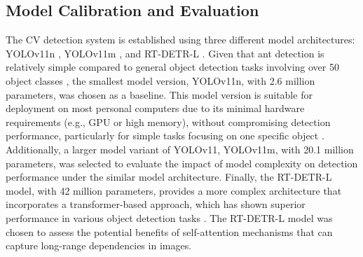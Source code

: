 \subsection{Model Calibration and Evaluation}

The CV detection system is established using three different model architectures: YOLOv11n \cite{jocher_yolo_2023}, YOLOv11m \cite{jocher_yolo_2023}, and RT-DETR-L \cite{ultralytics_rt-detr_nodate,lv_rtdetrv2_2024}. Given that ant detection is relatively simple compared to general object detection tasks involving over 50 object classes \cite{everingham_pascal_2010,lin_microsoft_2015}, the smallest model version, YOLOv11n, with 2.6 million parameters, was chosen as a baseline. This model version is suitable for deployment on most personal computers due to its minimal hardware requirements (e.g., GPU or high memory), without compromising detection performance, particularly for simple tasks focusing on one specific object \cite{das_evaluating_2025}. Additionally, a larger model variant of YOLOv11, YOLOv11m, with 20.1 million parameters, was selected to evaluate the impact of model complexity on detection performance under the similar model architecture. Finally, the RT-DETR-L model, with 42 million parameters, provides a more complex architecture that incorporates a transformer-based approach, which has shown superior performance in various object detection tasks \cite{ultralytics_rt-detr_nodate,lv_rtdetrv2_2024}. The RT-DETR-L model was chosen to assess the potential benefits of self-attention mechanisms that can capture long-range dependencies in images.

